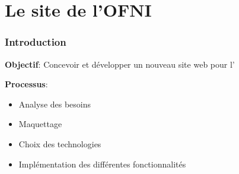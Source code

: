 \section{Le site de l'OFNI}

\begin{frame}
    \frametitle{Introduction}
    \centering
    \textbf{Objectif}: Concevoir et développer un nouveau site web pour l’\ofni
    \vspace{1,2cm}

    \pause

    \textbf{Processus}: 
    \begin{itemize}
        \item Analyse des besoins
        \item Maquettage
        \item Choix des technologies
        \item Implémentation des différentes fonctionnalités
    \end{itemize}
\end{frame}

